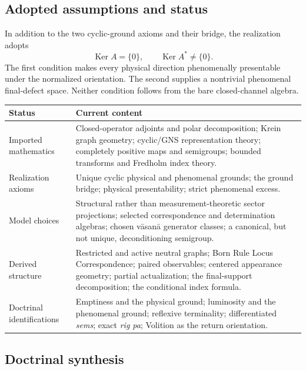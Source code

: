 \documentclass[11pt,reqno]{scrartcl}
\DeclareMathOperator{\Ker}{Ker}
\theoremstyle{plain}
\theoremstyle{definition}
\theoremstyle{remark}
\begin{document}
\subsection{Adopted assumptions and status}

In addition to the two cyclic-ground axioms and their bridge, the realization
adopts
\begin{equation}
  \boxed{
  \Ker A=\{0\},
  \qquad
  \Ker A^*\neq\{0\}.}
  \label{eq:adopted-asymmetry}
\end{equation}
The first condition makes every physical direction phenomenally presentable
under the normalized orientation.  The second supplies a nontrivial
phenomenal final-defect space.  Neither condition follows from the bare
closed-channel algebra.

\begin{center}
\small
\begin{tabularx}{\textwidth}{>{\raggedright\arraybackslash}p{}
>{\raggedright\arraybackslash}X}
\toprule
\textbf{Status} & \textbf{Current content} \\
\midrule
Imported mathematics & Closed-operator adjoints and polar decomposition;
Krein graph geometry; cyclic/GNS representation theory; completely positive
maps and semigroups; bounded transforms and Fredholm index theory. \\
\addlinespace
Realization axioms & Unique cyclic physical and phenomenal grounds; the
ground bridge; physical presentability; strict phenomenal excess. \\
\addlinespace
Model choices & Structural rather than measurement-theoretic sector
projections; selected correspondence and determination algebras; chosen
v\=asan\=a generator classes; a canonical, but not unique, deconditioning
semigroup. \\
\addlinespace
Derived structure & Restricted and active neutral graphs; Born Rule Locus
Correspondence; paired observables; centered appearance geometry; partial
actualization; the final-support decomposition; the conditional index formula. \\
\addlinespace
Doctrinal identifications & Emptiness and the physical ground; luminosity and
the phenomenal ground; reflexive terminality; differentiated \emph{sems};
exact \emph{rig pa}; Volition as the return orientation. \\
\bottomrule
\end{tabularx}
\end{center}

\subsection{Doctrinal synthesis}
\end{document}

